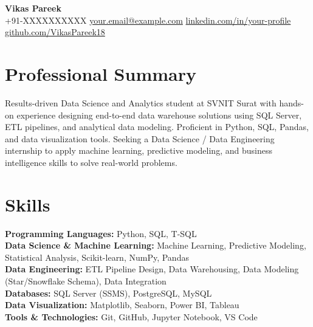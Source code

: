 \documentclass[10pt, letterpaper]{article}
\begin{document}
\begin{center}
  {\LARGE\bfseries Vikas Pareek}\\[4pt]
  +91-XXXXXXXXXX \quad
  \href{mailto:your.email@example.com}{your.email@example.com} \quad
  \href{https://linkedin.com/in/your-profile}{linkedin.com/in/your-profile} \quad
  \href{https://github.com/VikasPareek18}{github.com/VikasPareek18}
\end{center}

\section{Professional Summary}

Results-driven Data Science and Analytics student at SVNIT Surat with hands-on
experience designing end-to-end data warehouse solutions using SQL Server, ETL pipelines,
and analytical data modeling. Proficient in Python, SQL, Pandas, and data visualization
tools. Seeking a Data Science / Data Engineering internship to apply machine learning,
predictive modeling, and business intelligence skills to solve real-world problems.

\section{Skills}

\noindent
\textbf{Programming Languages:} Python, SQL, T-SQL \\
\textbf{Data Science \& Machine Learning:} Machine Learning, Predictive Modeling,
  Statistical Analysis, Scikit-learn, NumPy, Pandas \\
\textbf{Data Engineering:} ETL Pipeline Design, Data Warehousing,
  Data Modeling (Star/Snowflake Schema), Data Integration \\
\textbf{Databases:} SQL Server (SSMS), PostgreSQL, MySQL \\
\textbf{Data Visualization:} Matplotlib, Seaborn, Power BI, Tableau \\
\textbf{Tools \& Technologies:} Git, GitHub, Jupyter Notebook, VS Code
\end{document}
